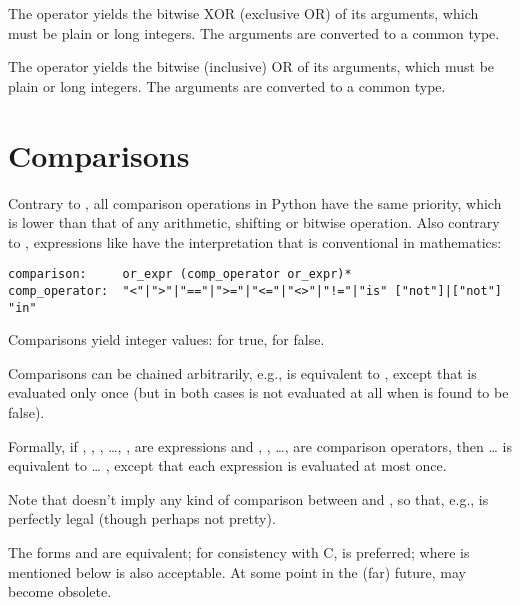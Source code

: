 The \code{\^} operator yields the bitwise XOR (exclusive OR) of its
arguments, which must be plain or long integers.  The arguments are
converted to a common type.

The \code{|} operator yields the bitwise (inclusive) OR of its
arguments, which must be plain or long integers.  The arguments are
converted to a common type.

\section{Comparisons\label{comparisons}}

Contrary to \C, all comparison operations in Python have the same
priority, which is lower than that of any arithmetic, shifting or
bitwise operation.  Also contrary to \C, expressions like
 have the interpretation that is conventional in
mathematics:

\begin{verbatim}
comparison:     or_expr (comp_operator or_expr)*
comp_operator:  "<"|">"|"=="|">="|"<="|"<>"|"!="|"is" ["not"]|["not"] "in"
\end{verbatim}

Comparisons yield integer values:  for true,  for false.

Comparisons can be chained arbitrarily, e.g.,  is
equivalent to , except that  is
evaluated only once (but in both cases  is not evaluated at all
when  is found to be false).

Formally, if , , , \ldots, ,  are
expressions and , , \ldots,  are comparison
operators, then  \ldots {} is equivalent
to     \ldots
{}, except that each expression is evaluated at most once.

Note that  doesn't imply any kind of comparison
between  and , so that, e.g.,  is
perfectly legal (though perhaps not pretty).

The forms \code{<>} and \code{!=} are equivalent; for consistency with
C, \code{!=} is preferred; where \code{!=} is mentioned below
\code{<>} is also acceptable.  At some point in the (far) future,
\code{<>} may become obsolete.

